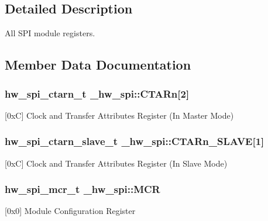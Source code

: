 \subsection{Detailed Description}
All S\+PI module registers. 

\subsection{Member Data Documentation}
\subsubsection[{\texorpdfstring{C\+T\+A\+Rn}{CTARn}}]{ {\bf hw\+\_\+spi\+\_\+ctarn\+\_\+t} \+\_\+hw\+\_\+spi\+::\+C\+T\+A\+Rn\mbox{[}2\mbox{]}}\hypertarget{struct__hw__spi_afae54d680e1fb5fc890919c2142e5211}{}\label{struct__hw__spi_afae54d680e1fb5fc890919c2142e5211}
\mbox{[}0xC\mbox{]} Clock and Transfer Attributes Register (In Master Mode) 
\subsubsection[{\texorpdfstring{C\+T\+A\+Rn\+\_\+\+S\+L\+A\+VE}{CTARn_SLAVE}}]{ {\bf hw\+\_\+spi\+\_\+ctarn\+\_\+slave\+\_\+t} \+\_\+hw\+\_\+spi\+::\+C\+T\+A\+Rn\+\_\+\+S\+L\+A\+VE\mbox{[}1\mbox{]}}\hypertarget{struct__hw__spi_a99a927d2c4977158e0bf80f8a7c43e72}{}\label{struct__hw__spi_a99a927d2c4977158e0bf80f8a7c43e72}
\mbox{[}0xC\mbox{]} Clock and Transfer Attributes Register (In Slave Mode) 
\subsubsection[{\texorpdfstring{M\+CR}{MCR}}]{ {\bf hw\+\_\+spi\+\_\+mcr\+\_\+t} \+\_\+hw\+\_\+spi\+::\+M\+CR}\hypertarget{struct__hw__spi_a101b74d9f01466e25b23696684138049}{}\label{struct__hw__spi_a101b74d9f01466e25b23696684138049}
\mbox{[}0x0\mbox{]} Module Configuration Register 
